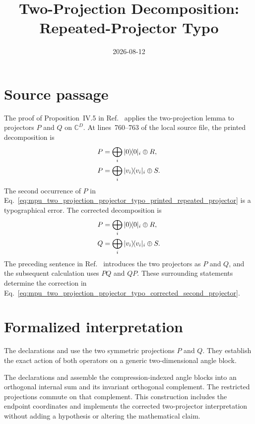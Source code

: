 \documentclass{article}
\title{Two-Projection Decomposition: Repeated-Projector Typo}
\author{}
\date{2026-08-12}
\begin{document}
\maketitle
{}

\section{Source passage}

The proof of Proposition~IV.5 in Ref.~\cite{Cirac2017MPU} applies the
two-projection lemma to projectors $P$ and $Q$ on $\mathbb{C}^D$. At
lines~760--763 of the local source file, the printed decomposition is
\begin{align}
    P
        &= \bigoplus_i |0\rangle\!\langle 0|_i\oplus R,
    \label{eq:mpu_two_projection_projector_typo_printed_first_projector}\\
    P
        &= \bigoplus_i |v_i\rangle\!\langle v_i|_i\oplus S.
    \label{eq:mpu_two_projection_projector_typo_printed_repeated_projector}
\end{align}
The second occurrence of $P$ in
Eq.~\ref{eq:mpu_two_projection_projector_typo_printed_repeated_projector} is a
typographical error. The corrected decomposition is
\begin{align}
    P
        &= \bigoplus_i |0\rangle\!\langle 0|_i\oplus R,
    \label{eq:mpu_two_projection_projector_typo_corrected_first_projector}\\
    Q
        &= \bigoplus_i |v_i\rangle\!\langle v_i|_i\oplus S.
    \label{eq:mpu_two_projection_projector_typo_corrected_second_projector}
\end{align}
The preceding sentence in Ref.~\cite{Cirac2017MPU} introduces the two
projectors as $P$ and $Q$, and the subsequent calculation uses $PQ$ and $QP$.
These surrounding statements determine the correction in
Eq.~\ref{eq:mpu_two_projection_projector_typo_corrected_second_projector}.

\section{Formalized interpretation}

The declarations
 and
 use the
two symmetric projections $P$ and $Q$. They establish the exact action of both
operators on a generic two-dimensional angle block.

The declarations
 and
 assemble the
compression-indexed angle blocks into an orthogonal internal sum and its
invariant orthogonal complement. The restricted projections commute on that
complement. This construction includes the endpoint coordinates and implements
the corrected two-projector interpretation without adding a hypothesis or
altering the mathematical claim.
\end{document}
